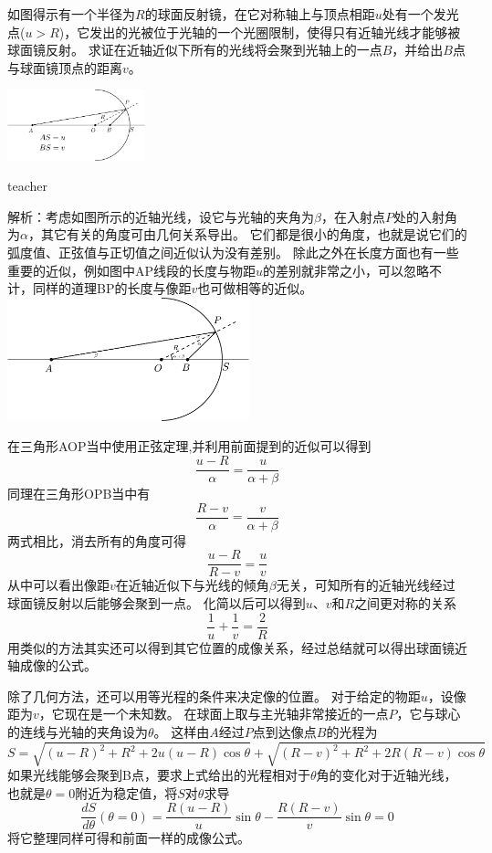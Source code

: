 \begin{example}
如图得示有一个半径为$R$的球面反射镜，在它对称轴上与顶点相距$u$处有一个发光点($u>R$)，它发出的光被位于光轴的一个光圈限制，使得只有近轴光线才能够被球面镜反射。
求证在近轴近似下所有的光线将会聚到光轴上的一点$B$，并给出$B$点与球面镜顶点的距离$v$。

\begin{flushright}
\includegraphics[width=0.3\textwidth]{images/sphrical-mirrow.pdf}
\end{flushright}
\begin{taggedblock}{teacher}



\noindent
解析：考虑如图所示的近轴光线，设它与光轴的夹角为$\beta$，在入射点$P$处的入射角为$\alpha$，其它有关的角度可由几何关系导出。
它们都是很小的角度，也就是说它们的弧度值、正弦值与正切值之间近似认为没有差别。
除此之外在长度方面也有一些重要的近似，例如图中AP线段的长度与物距$u$的差别就非常之小，可以忽略不计，同样的道理BP的长度与像距$v$也可做相等的近似。
\includegraphics[width=7cm]{images/sphrical-mirrow-solution}

在三角形AOP当中使用正弦定理,并利用前面提到的近似可以得到
\[
\frac{u-R}{\alpha}=\frac{u}{\alpha+\beta}
\]
同理在三角形OPB当中有
\[
\frac{R-v}{\alpha}=\frac{v}{\alpha+\beta}
\]
两式相比，消去所有的角度可得
\[
\frac{u-R}{R-v}=\frac{u}{v}
\]
从中可以看出像距$v$在近轴近似下与光线的倾角$\beta$无关，可知所有的近轴光线经过球面镜反射以后能够会聚到一点。
化简以后可以得到$u$、$v$和$R$之间更对称的关系
\[\frac{1}{u}+\frac{1}{v}=\frac{2}{R}\]
用类似的方法其实还可以得到其它位置的成像关系，经过总结就可以得出球面镜近轴成像的公式。

除了几何方法，还可以用等光程的条件来决定像的位置。
对于给定的物距$u$，设像距为$v$，它现在是一个未知数。
在球面上取与主光轴非常接近的一点$P$，它与球心的连线与光轴的夹角设为$\theta$。
这样由$A$经过$P$点到达像点$B$的光程为
\[
S = \sqrt{(u-R)^2+R^2+2u(u-R)\cos\theta}+\sqrt{(R-v)^2+R^2+2R(R-v)\cos\theta}
\]
如果光线能够会聚到B点，要求上式给出的光程相对于$\theta$角的变化对于近轴光线，也就是$\theta=0$附近为稳定值，将$S$对$\theta$求导
\[
\frac{dS}{d\theta}(\theta = 0) = \frac{R(u-R)}{u}\sin\theta -\frac{R(R-v)}{v}\sin\theta=0 
\]
将它整理同样可得和前面一样的成像公式。
\end{taggedblock}
\end{example}


